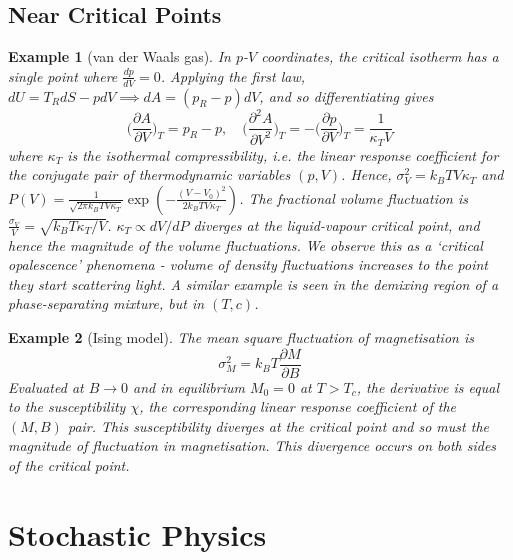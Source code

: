 \documentclass[a4paper]{article}
\newtheorem{eg}{Example}[section]
\theoremstyle{new}
\begin{document}
\subsection{Near Critical Points}
\begin{eg}[van der Waals gas]
In $p$-$V$ coordinates, the critical isotherm has a single point where $\frac{dp}{dV}=0$. Applying the first law, $dU=T_RdS-pdV\implies dA=(p_R-p)dV$, and so differentiating gives
$$\bigg(\frac{\partial A}{\partial V}\bigg)_T=p_R-p,\quad\bigg(\frac{\partial^2A}{\partial V^2}\bigg)_T=-\bigg(\frac{\partial p}{\partial V}\bigg)_T=\frac{1}{\kappa_TV}$$
where $\kappa_T$ is the isothermal compressibility, i.e. the linear response coefficient for the conjugate pair of thermodynamic variables $(p,V)$. Hence, $\sigma_V^2=k_BTV\kappa_T$  and $P(V)=\frac{1}{\sqrt{2\pi k_BTV\kappa_T}}\exp(-\frac{(V-V_0)^2}{2k_BTV\kappa_T})$. The fractional volume fluctuation is $\frac{\sigma_V}{V}=\sqrt{k_BT\kappa_T/V}$. $\kappa_T\propto dV/dP$ diverges at the liquid-vapour critical point, and hence the magnitude of the volume fluctuations. We observe this as a `critical opalescence' phenomena - volume of density fluctuations increases to the point they start scattering light. A similar example is seen in the demixing region of a phase-separating mixture, but in $(T,c)$.
\end{eg}
\begin{eg}[Ising model]
The mean square fluctuation of magnetisation is
$$\sigma_M^2=k_BT\frac{\partial M}{\partial B}$$
Evaluated at $B\rightarrow 0$ and in equilibrium $M_0=0$ at $T>T_c$, the derivative is equal to the susceptibility $\chi$, the corresponding linear response coefficient of the $(M,B)$ pair. This susceptibility diverges at the critical point and so must the magnitude of fluctuation in magnetisation. This divergence occurs on both sides of the critical point.
\end{eg}
\newpage
\section{Stochastic Physics}
\end{document}
